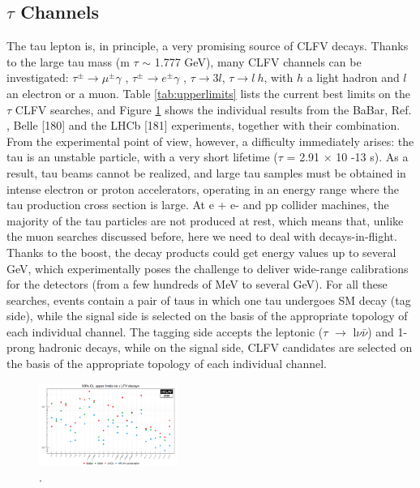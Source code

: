 \subsection{$\tau$ Channels}
The tau lepton is, in principle, a very promising source of CLFV decays. Thanks to the
large tau mass (m $\tau$ $\sim$ 1.777 GeV), many CLFV channels can be investigated: $\tau^\pm \rightarrow \mu^\pm \gamma$ ,
$\tau^\pm\rightarrow e^\pm\gamma$ , $\tau \rightarrow 3l$, $\tau\rightarrow l \ h$, with $h$ a light hadron and $l$ an electron or a muon. Table \ref{tab:upperlimits}
lists the current best limits on the $\tau$ CLFV searches, and Figure \ref{fig:tauchannel} shows the individual results from the
BaBar, Ref. \cite{PhysRevD.77.091104}, Belle [180] and the LHCb [181] experiments, together with their combination.
From the experimental point of view, however, a difficulty immediately arises: the
tau is an unstable particle, with a very short lifetime ($\tau$ = 2.91 $\times$ 10 -13 s). As a result, tau
beams cannot be realized, and large tau samples must be obtained in intense electron or
proton accelerators, operating in an energy range where the tau production cross section is
large. At e + e- and pp collider machines, the majority of the tau particles are not produced
at rest, which means that, unlike the muon searches discussed before, here we need to deal
with decays-in-flight. Thanks to the boost, the decay products could get energy values up
to several GeV, which experimentally poses the challenge to deliver wide-range calibrations for the detectors (from a few hundreds of MeV to several GeV). For all these searches, events contain a pair of taus in which one tau undergoes SM decay (tag side), while the signal side is selected on the basis of the appropriate topology of each individual channel. The tagging side accepts the leptonic ($\tau$ $\rightarrow$ l$\nu$$\bar{\nu}$) and 1-prong hadronic decays, while on the signal side, CLFV candidates are selected on the basis of the appropriate topology of each individual channel.
\begin{figure}[!h]
\centering
\includegraphics[width =0.4\textwidth]{figures/png/Screenshot_20240313_133439.png}
\caption{\cite{Amhis_2021}.}
\label{fig:tauchannel}
\end{figure}
